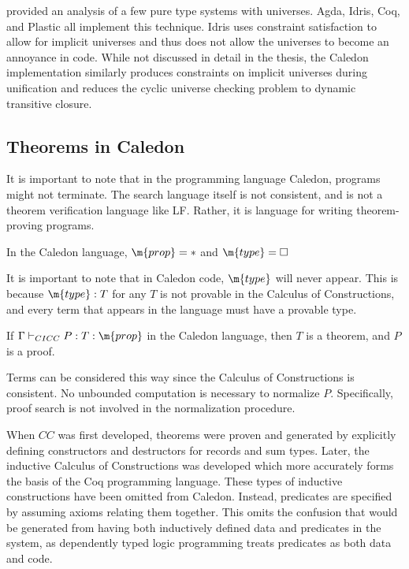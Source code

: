 \citet{harper1991type} provided an analysis of a few pure type systems with universes.
Agda, Idris, Coq,
and Plastic \citep{callaghan2001implementation} all implement this technique.
Idris uses constraint satisfaction to allow for implicit universes
and thus does not allow the universes to become an annoyance in code. 
While not discussed in detail in the thesis, the Caledon implementation similarly produces constraints on implicit 
universes during unification and reduces the cyclic universe checking problem to dynamic transitive closure.

\subsection{Theorems in Caledon}

It is important to note that in the programming language Caledon, programs might not terminate.  
The search language itself is not consistent, and is not a theorem verification language like LF.  
Rather, it is language for writing theorem-proving programs.  

\begin{definition}
In the Caledon language, $\m{prop} = *$ and $\m{type} = \Box$
\end{definition}

It is important to note that in Caledon code, $\m{type}$ will never appear.  This is because $\m{type} : T$ for any $T$
is not provable in the Calculus of Constructions, and every term that appears in the language must have a provable type.

\begin{definition}
If $\Gamma \vdash_{CICC} P : T : \m{prop}$ in the Caledon language, then $T$ is a theorem, and $P$ is a proof.
\end{definition}

Terms can be considered this way since the Calculus of Constructions is consistent.
No unbounded computation is necessary to normalize $P$.
Specifically, proof search is not involved in the normalization procedure.

When $CC$ was first developed, theorems were proven and generated by explicitly defining
constructors and destructors for records and sum types.  Later, the inductive Calculus of Constructions was developed 
\citep{coquand1990inductively} which more accurately forms the basis of the Coq programming language.  These types of inductive
constructions have been omitted from Caledon.  Instead, predicates are specified by assuming axioms relating them together.
This omits the confusion that would be generated from having both inductively defined data and predicates in the system, as 
dependently typed logic programming treats predicates as both data and code.

